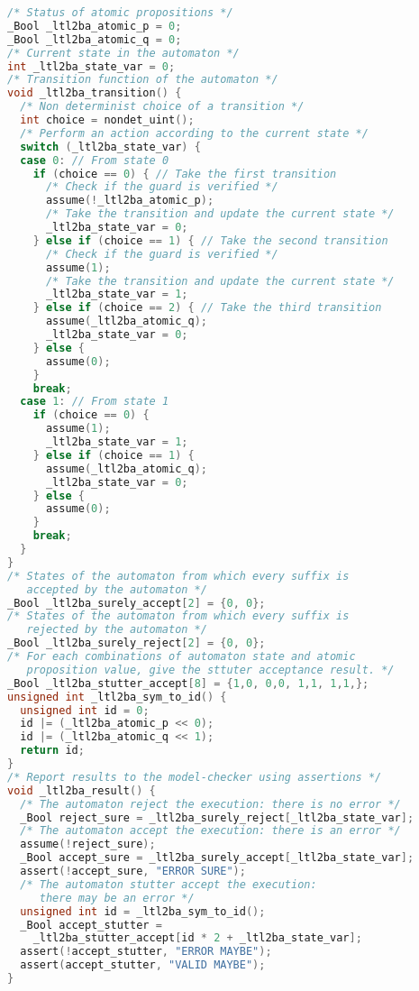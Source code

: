 \begin{lstlisting}[language=C, frame=single, label=lst:C_automaton,
    caption=Code de l'automate représentant \(G (p \implies F q)\)]
/* Status of atomic propositions */
_Bool _ltl2ba_atomic_p = 0;
_Bool _ltl2ba_atomic_q = 0;
/* Current state in the automaton */
int _ltl2ba_state_var = 0;
/* Transition function of the automaton */
void _ltl2ba_transition() {
  /* Non determinist choice of a transition */
  int choice = nondet_uint();
  /* Perform an action according to the current state */
  switch (_ltl2ba_state_var) {
  case 0: // From state 0
    if (choice == 0) { // Take the first transition
      /* Check if the guard is verified */
      assume(!_ltl2ba_atomic_p);
      /* Take the transition and update the current state */
      _ltl2ba_state_var = 0;
    } else if (choice == 1) { // Take the second transition
      /* Check if the guard is verified */
      assume(1);
      /* Take the transition and update the current state */
      _ltl2ba_state_var = 1;
    } else if (choice == 2) { // Take the third transition
      assume(_ltl2ba_atomic_q);
      _ltl2ba_state_var = 0;
    } else {
      assume(0);
    }
    break;
  case 1: // From state 1
    if (choice == 0) {
      assume(1);
      _ltl2ba_state_var = 1;
    } else if (choice == 1) {
      assume(_ltl2ba_atomic_q);
      _ltl2ba_state_var = 0;
    } else {
      assume(0);
    }
    break;
  }
}
/* States of the automaton from which every suffix is
   accepted by the automaton */
_Bool _ltl2ba_surely_accept[2] = {0, 0};
/* States of the automaton from which every suffix is
   rejected by the automaton */
_Bool _ltl2ba_surely_reject[2] = {0, 0};
/* For each combinations of automaton state and atomic
   proposition value, give the sttuter acceptance result. */
_Bool _ltl2ba_stutter_accept[8] = {1,0, 0,0, 1,1, 1,1,};
unsigned int _ltl2ba_sym_to_id() {
  unsigned int id = 0;
  id |= (_ltl2ba_atomic_p << 0);
  id |= (_ltl2ba_atomic_q << 1);
  return id;
}
/* Report results to the model-checker using assertions */
void _ltl2ba_result() {
  /* The automaton reject the execution: there is no error */
  _Bool reject_sure = _ltl2ba_surely_reject[_ltl2ba_state_var];
  /* The automaton accept the execution: there is an error */
  assume(!reject_sure);
  _Bool accept_sure = _ltl2ba_surely_accept[_ltl2ba_state_var];
  assert(!accept_sure, "ERROR SURE");
  /* The automaton stutter accept the execution:
     there may be an error */
  unsigned int id = _ltl2ba_sym_to_id();
  _Bool accept_stutter =
    _ltl2ba_stutter_accept[id * 2 + _ltl2ba_state_var];
  assert(!accept_stutter, "ERROR MAYBE");
  assert(accept_stutter, "VALID MAYBE");
}
\end{lstlisting}

